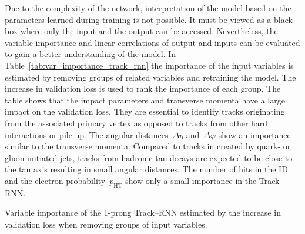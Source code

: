 Due to the complexity of the network, interpretation of the model based on the
parameters learned during training is not possible. It must be viewed as a black
box where only the input and the output can be accessed. Nevertheless, the
variable importance and linear correlations of output and inputs can be
evaluated to gain a better understanding of the model. In
Table~\ref{tab:var_importance_track_rnn} the importance of the input variables
is estimated by removing groups of related variables and retraining the model.
The increase in validation loss is used to rank the importance of each group.
The table shows that the impact parameters and transverse momenta have a large
impact on the validation loss. They are essential to identify tracks originating
from the associated primary vertex as opposed to tracks from other hard
interactions or pile-up. The angular distances~$\Delta \eta$
and~$\Delta \varphi$ show an importance similar to the transverse momenta.
Compared to tracks in \tauhadvis created by quark- or gluon-initiated jets,
tracks from hadronic tau decays are expected to be close to the tau axis
resulting in small angular distances. The number of hits in the ID and the
electron probability~$p_\text{HT}$ show only a small importance in the
Track--RNN.

\begin{table}[htb]
  \centering
  {\small}
  \caption{Variable importance of the 1-prong Track--RNN estimated by the
    increase in validation loss when removing groups of input variables.}
  \label{tab:var_importance_track_rnn}
\end{table}

